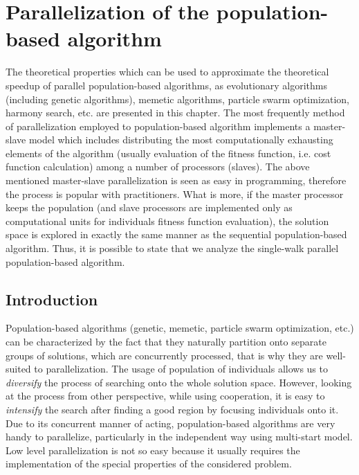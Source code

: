 \chapter{Parallelization of the population-based algorithm}
\thispagestyle{empty}

The 
theoretical properties which can be used to approximate the
theoretical speed\-up of parallel population-based algorithms, as evolutionary algorithms (including genetic algorithms), memetic algorithms, particle swarm
optimization, harmony search, etc. are presented in this chapter. The most
frequently method of parallelization employed to population-based algorithm
implements a master-slave model which includes distributing the most
computationally exhausting elements of the algorithm (usually
evaluation of the fitness function, i.e. cost function
calculation) among a number of processors (slaves). The above mentioned master-slave parallelization is seen as easy in programming, therefore the process is popular with practitioners. What is more, if the
master processor keeps the population (and slave processors are
implemented only as computational units for individuals fitness function
evaluation), the solution space is explored in exactly the same
manner as the sequential population-based algorithm. Thus, it is possible to state that we analyze the single-walk parallel population-based algorithm.


\section{Introduction}

Population-based algorithms (genetic, memetic, particle swarm
optimization, etc.) can be characterized by the fact that they
naturally partition onto separate groups of solutions, which are
concurrently processed, that is why they are well-suited to parallelization. 
The usage of population of
individuals allows us to \emph{diversify} the process of searching onto
the whole solution space. However, looking at the process from other perspective, while using cooperation, it
is easy to \emph{intensify} the search after finding a good region
by focusing individuals onto it. Due to its concurrent manner of acting,
population-based algorithms are very handy to parallelize,
particularly in the independent way using multi-start model. Low
level parallelization is not so easy because it usually requires the implementation of the special properties of
the considered problem.

